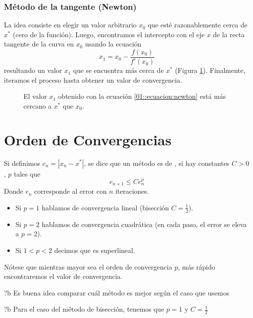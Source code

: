 \documentclass[english, spanish, fleqn, 10pt]{article}
\newcommand{\definicion}[1]{\textit{\underline{\smash{#1}}}}
\numberwithin{equation}{section}
\newcommand{\nparentesis}[1]{\left( #1 \right)}
\newcommand{\nabsoluto}[1]{\left| #1 \right|}
\theoremstyle{definition}
\newenvironment{newquote}{\renewcommand{\arraystretch}{1.8}\color[HTML]{009933}\begin{longtable}{?b}}{\end{longtable}\renewcommand{\arraystretch}{1.3}}
\begin{document}
\subsubsection{Método de la tangente (Newton)}
La idea consiste en elegir un valor arbitrario $x_0$ que esté razonablemente cerca de $x^*$ (cero de la función). Luego, encontramos el intercepto con el eje $x$ de la recta tangente de la curva en $x_0$ usando la ecuación
\begin{equation}\label{01::ecuacion:newton}
x_1=x_0-\dfrac{f\nparentesis{x_0}}{f'\nparentesis{x_0}}
\end{equation}
resultando un valor $x_1$ que se encuentra más cerca de $x^*$ (Figura \ref{01::newton:grafico}). Finalmente, iteramos el proceso hasta obtener un valor de convergencia.
\begin{figure}[!h]
	\centering
	\caption{El valor $x_1$ obtenido con la ecuación \eqref{01::ecuacion:newton} está más cercano a $x^*$ que $x_0$.}
	\label{01::newton:grafico}
\end{figure}


\section{Orden de Convergencias}
Si definimos $e_n=\nabsoluto{x_n-x^*}$, se dice que un método es de \definicion{orden $p$}, si hay constantes $C > 0$, $p$ tales que
\begin{equation}
	e_{n+1} \leq C e_n^p
\end{equation}
Donde $e_n$ corresponde al error con $n$ iteraciones.

\begin{itemize}
	\item Si $p=1$ hablamos de convergencia lineal (bisección $C=\frac{1}{2}$).
	
	\item Si $p=2$ hablamos de convergencia cuadrática (en cada paso, el error se eleva a $p=2$).
	
	\item Si  $1 < p < 2$ decimos que es superlineal.
\end{itemize}
Nótese que mientras mayor sea el orden de convergencia $p$, más rápido encontraremos el valor de convergencia.

\begin{newquote}
	Es buena idea comparar cuál método es mejor según el caso que usemos
\end{newquote}
\vspace{-1.5em}
\begin{newquote}
	Para el caso del método de bisección, tenemos que $p=1$ y $C=\frac{1}{2}$
\end{newquote}
\end{document}
